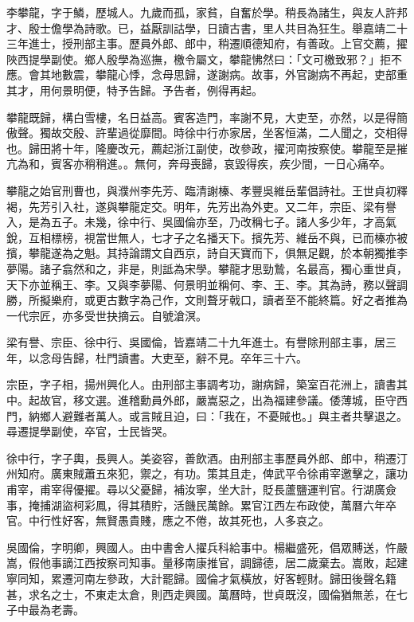 \begin{pinyinscope}
李攀龍，字于鱗，歷城人。九歲而孤，家貧，自奮於學。稍長為諸生，與友人許邦才、殷士儋學為詩歌。已，益厭訓詁學，日讀古書，里人共目為狂生。舉嘉靖二十三年進士，授刑部主事。歷員外郎、郎中，稍遷順德知府，有善政。上官交薦，擢陜西提學副使。鄉人殷學為巡撫，檄令屬文，攀龍怫然曰：「文可檄致邪？」拒不應。會其地數震，攀龍心悸，念母思歸，遂謝病。故事，外官謝病不再起，吏部重其才，用何景明便，特予告歸。予告者，例得再起。

攀龍既歸，構白雪樓，名日益高。賓客造門，率謝不見，大吏至，亦然，以是得簡傲聲。獨故交殷、許輩過從靡間。時徐中行亦家居，坐客恒滿，二人聞之，交相得也。歸田將十年，隆慶改元，薦起浙江副使，改參政，擢河南按察使。攀龍至是摧亢為和，賓客亦稍稍進。。無何，奔母喪歸，哀毀得疾，疾少間，一日心痛卒。

攀龍之始官刑曹也，與濮州李先芳、臨清謝榛、孝豐吳維岳輩倡詩社。王世貞初釋褐，先芳引入社，遂與攀龍定交。明年，先芳出為外吏。又二年，宗臣、梁有譽入，是為五子。未幾，徐中行、吳國倫亦至，乃改稱七子。諸人多少年，才高氣銳，互相標榜，視當世無人，七才子之名播天下。擯先芳、維岳不與，已而榛亦被擯，攀龍遂為之魁。其持論謂文自西京，詩自天寶而下，俱無足觀，於本朝獨推李夢陽。諸子翕然和之，非是，則詆為宋學。攀龍才思勁鷙，名最高，獨心重世貞，天下亦並稱王、李。又與李夢陽、何景明並稱何、李、王、李。其為詩，務以聲調勝，所擬樂府，或更古數字為己作，文則聱牙戟口，讀者至不能終篇。好之者推為一代宗匠，亦多受世抉摘云。自號滄溟。

梁有譽、宗臣、徐中行、吳國倫，皆嘉靖二十九年進士。有譽除刑部主事，居三年，以念母告歸，杜門讀書。大吏至，辭不見。卒年三十六。

宗臣，字子相，揚州興化人。由刑部主事調考功，謝病歸，築室百花洲上，讀書其中。起故官，移文選。進稽勳員外郎，嚴嵩惡之，出為福建參議。倭薄城，臣守西門，納鄉人避難者萬人。或言賊且迫，曰：「我在，不憂賊也。」與主者共擊退之。尋遷提學副使，卒官，士民皆哭。

徐中行，字子輿，長興人。美姿容，善飲酒。由刑部主事歷員外郎、郎中，稍遷汀州知府。廣東賊蕭五來犯，禦之，有功。策其且走，俾武平令徐甫宰邀擊之，讓功甫宰，甫宰得優擢。尋以父憂歸，補汝寧，坐大計，貶長蘆鹽運判官。行湖廣僉事，掩捕湖盜柯彩鳳，得其積貯，活饑民萬餘。累官江西左布政使，萬曆六年卒官。中行性好客，無賢愚貴賤，應之不倦，故其死也，人多哀之。

吳國倫，字明卿，興國人。由中書舍人擢兵科給事中。楊繼盛死，倡眾賻送，忤嚴嵩，假他事謫江西按察司知事。量移南康推官，調歸德，居二歲棄去。嵩敗，起建寧同知，累遷河南左參政，大計罷歸。國倫才氣橫放，好客輕財。歸田後聲名籍甚，求名之士，不東走太倉，則西走興國。萬曆時，世貞既沒，國倫猶無恙，在七子中最為老壽。


\end{pinyinscope}
